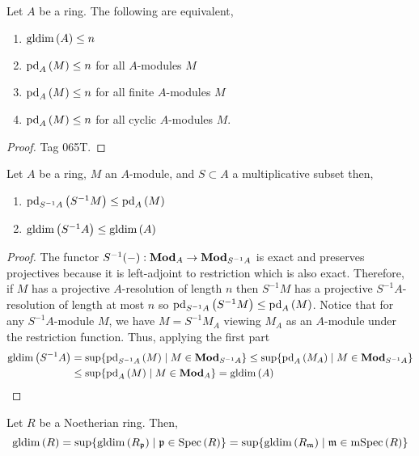 \documentclass[12pt]{article}
\begin{document}
\begin{theorem}
Let $A$ be a ring. The following are equivalent,
\begin{enumerate}
\item $\mathrm{gldim}\left( A \right) \le n$
\item $\mathrm{pd}_{A} \left( M \right) \le n$ for all $A$-modules $M$
\item $\mathrm{pd}_{A} \left( M \right) \le n$ for all finite $A$-modules $M$
\item $\mathrm{pd}_{A} \left( M \right) \le n$ for all cyclic $A$-modules $M$.
\end{enumerate}
\end{theorem}

\begin{proof}
Tag 065T.
\end{proof}

\begin{lemma}
Let $A$ be a ring, $M$ an $A$-module, and $S \subset A$ a multiplicative subset then,
\begin{enumerate}
\item $\mathrm{pd}_{S^{-1}A} \left( S^{-1} M \right) \le \mathrm{pd}_{A} \left( M \right)$
\item $\mathrm{gldim}\left( S^{-1} A \right) \le \mathrm{gldim}\left( A \right)$
\end{enumerate}
\end{lemma}

\begin{proof}
The functor $S^{-1}(-) : \mathbf{Mod}_{A} \to \mathbf{Mod}_{S^{-1} A}$ is exact and preserves projectives because it is left-adjoint to restriction which is also exact. Therefore, if $M$ has a projective $A$-resolution of length $n$ then $S^{-1} M$ has a projective $S^{-1} A$-resolution of length at most $n$ so $\mathrm{pd}_{S^{-1} A} \left( S^{-1} M \right) \le \mathrm{pd}_{A} \left( M \right)$. Notice that for any $S^{-1} A$-module $M$, we have $M = S^{-1} M_A$ viewing $M_A$ as an $A$-module under the restriction function. Thus, applying the first part
\begin{align*}
\mathrm{gldim}\left( S^{-1} A \right) & = \sup \{ \mathrm{pd}_{S^{-1} A} \left( M \right) \mid M \in \mathbf{Mod}_{S^{-1} A} \} \le \sup \{ \mathrm{pd}_{A} \left( M_A \right) \mid M \in \mathbf{Mod}_{S^{-1} A} \} 
\\
& \le \sup \{ \mathrm{pd}_{A} \left( M \right) \mid M \in \mathbf{Mod}_{A} \} = \mathrm{gldim}\left( A \right) 
\end{align*}
\end{proof}

\begin{prop}
Let $R$ be a Noetherian ring. Then,
\[ \mathrm{gldim}\left( R \right) = \sup \{ \mathrm{gldim}\left( R_{\mathfrak{p}} \right) \mid \mathfrak{p} \in \mathrm{Spec}\left( R \right) \} = \sup \{ \mathrm{gldim}\left( R_{\mathfrak{m}} \right) \mid \mathfrak{m} \in \mathrm{mSpec}\left( R \right) \} \]
\end{prop}
\end{document}
